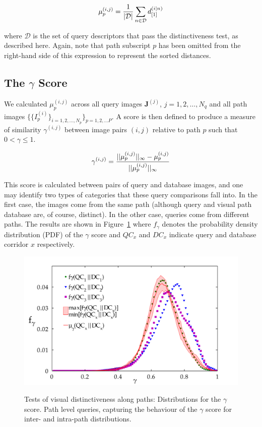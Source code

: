 \begin{equation}
\centering
\mu^{(i,j)}_p=\frac{1}{|\mathcal{D}|}\sum_{n\in \mathcal{D}} d^{(i|n)}_{[1]}
\end{equation}

where $\mathcal{D}$ is the set of query descriptors that pass the distinctiveness test, as described here. Again, note that path subscript $p$ has been omitted from the right-hand side of this expression to represent the sorted distances.

\subsection{The $\gamma$ Score} We calculated  $\mu_p^{(i,j)}$ across all query images $\mathbf{J}^{(j)}$, $j=1,2,\ldots,N_q$ and all path images $\lbrace\lbrace I^{(i)}_p\rbrace_{i=1,2,\ldots,N_p}\rbrace_{p=1,2,\ldots P}$.   A score is then defined to produce a measure of similarity $\gamma^{(i,j)}$ between image pairs $(i,j)$ relative to path $p$ such that $0 < \gamma \le 1$. 


\begin{equation}
\centering
\gamma^{(i,j)} = \frac{||\mu^{(i,j)}_p||_{\infty}-\mu^{(i,j)}_p}{||\mu^{(i,j)}_p||_{\infty}}
\end{equation}

This score is calculated between pairs of query and database images, and one may identify two types of categories that these query comparisons fall into.  In the first case, the images come from the same path (although query and visual path database are, of course, distinct).  In the other case, queries come from different paths.  The results are shown in Figure~\ref{fig:gammaDistribution} where $f_\gamma$ denotes the probability density distribution (PDF) of the $\gamma$ score and $QC_x$ and $DC_x$ indicate query and database corridor $x$ respectively.   

\begin{figure}[ht]
\centering
{\includegraphics[width=\linewidth]{./gfx/Chapter02/path_pdf_analysisWithShadedBetweensALLDB.pdf}}
\caption{Tests of visual distinctiveness along paths: Distributions for the $\gamma$ score. Path level queries, capturing the behaviour of the $\gamma$ score for inter- and intra-path distributions.}
\label{fig:gammaDistribution}
\end{figure}
 



